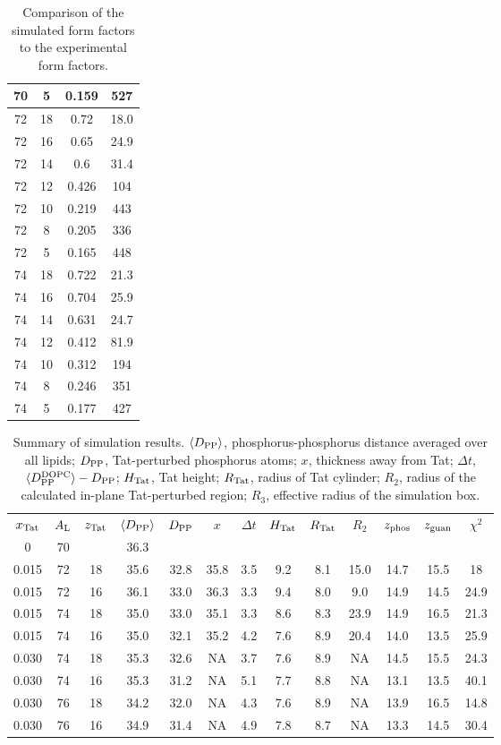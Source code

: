 \begin{table}[htbp]
\begin{tabular}{c c c c}
    70 & 5  & 0.159	& 527 \\
    \hline
    72 & 18 & 0.72  & 18.0 \\
    72 & 16 & 0.65  & 24.9 \\
    72 & 14 & 0.6   & 31.4 \\
    72 & 12 & 0.426	& 104 \\
    72 & 10 & 0.219 & 443 \\
    72 & 8  & 0.205 & 336 \\
    72 & 5  & 0.165 & 448 \\
    \hline
    74 & 18 & 0.722 & 21.3 \\
    74 & 16 & 0.704	& 25.9 \\
    74 & 14 & 0.631 & 24.7 \\
    74 & 12 & 0.412 & 81.9 \\
    74 & 10 & 0.312 & 194 \\
    74 & 8  & 0.246 & 351 \\
    74 & 5  & 0.177 & 427 \\
    \hline
  \end{tabular}
  \caption{Comparison of the simulated form factors to the 
  experimental form factors.}
  \label{tb:MD_sim-exp}
\end{table}

\begin{table}
  \centering
  \begin{tabular}{c c c c c c c c c c c c c}
    $x_\textrm{Tat}$ & $A_\textrm{L}$ & $z_\textrm{Tat}$ & $\langle D_\textrm{PP}\rangle$ & $D_\textrm{PP}$ & $x$ & $\Delta t$ & $H_\textrm{Tat}$ & $R_\textrm{Tat}$ & $R_2$ & $z_\textrm{phos}$ & $z_\textrm{guan}$ & $\chi^2$ \\
    0 & 70 & & 36.3 & & & \\
    0.015 & 72 & 18 & 35.6 & 32.8 & 35.8 & 3.5 & 9.2 & 8.1 & 15.0 & 14.7 & 15.5 & 18 \\ 
    0.015 & 72 & 16 & 36.1 & 33.0 & 36.3 & 3.3 & 9.4 & 8.0 & 9.0  & 14.9 & 14.5 & 24.9 \\
    0.015 & 74 & 18 & 35.0 & 33.0 & 35.1 & 3.3 & 8.6 & 8.3 & 23.9 & 14.9 & 16.5 & 21.3 \\
    0.015 & 74 & 16 & 35.0 & 32.1 & 35.2 & 4.2 & 7.6 & 8.9 & 20.4 & 14.0 & 13.5 & 25.9 \\
    0.030 & 74 & 18 & 35.3 & 32.6 & NA   & 3.7 & 7.6 & 8.9 & NA   & 14.5 & 15.5 & 24.3 \\ 
    0.030 & 74 & 16 & 35.3 & 31.2 & NA   & 5.1 & 7.7 & 8.8 & NA   & 13.1 & 13.5 & 40.1 \\
    0.030 & 76 & 18 & 34.2 & 32.0 & NA   & 4.3 & 7.6 & 8.9 & NA   & 13.9 & 16.5 & 14.8 \\
    0.030 & 76 & 16 & 34.9 & 31.4 & NA   & 4.9 & 7.8 & 8.7 & NA   & 13.3 & 14.5 & 30.4
  \end{tabular}
  \caption{Summary of simulation results. $\langle D_\textrm{PP}\rangle$, phosphorus-phosphorus 
  distance averaged over all lipids; $D_\textrm{PP}$, Tat-perturbed phosphorus atoms; 
  $x$, thickness away from Tat; $\Delta t$, $\langle D_\textrm{PP}^\textrm{DOPC}\rangle-D_\textrm{PP}$; $H_\textrm{Tat}$, Tat 
  height; $R_\textrm{Tat}$, radius of Tat cylinder; $R_2$, radius of the calculated
  in-plane Tat-perturbed region; $R_3$, effective radius of the simulation box.}
  \label{tb:MD_summary}
\end{table}

